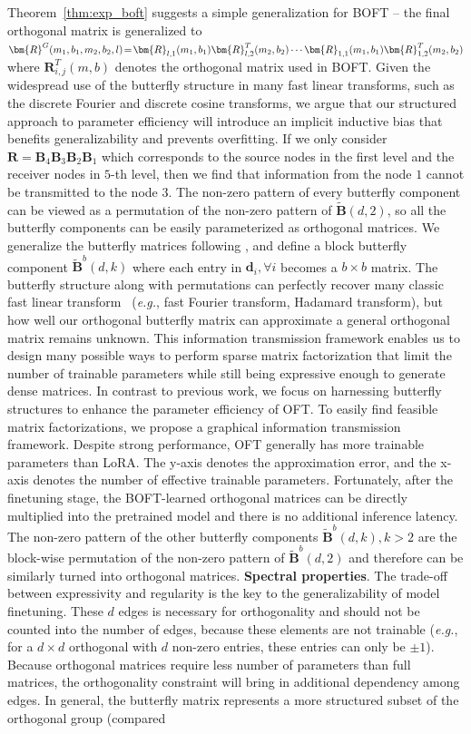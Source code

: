 Theorem~\ref{thm:exp_boft} suggests a simple generalization for BOFT -- the final orthogonal matrix is generalized to $\thickmuskip=2mu \medmuskip=2mu \bm{R}^G(m_1,b_1,m_2,b_2,l)=\bm{R}_{l,1}(m_1,b_1)\bm{R}_{l,2}^T(m_2,b_2)\cdots\bm{R}_{1,1}(m_1,b_1)\bm{R}_{1,2}^T(m_2,b_2)$ where $\bm{R}_{i,j}^T(m,b)$ denotes the orthogonal matrix used in BOFT. Given the widespread use of the butterfly structure in many fast linear transforms, such as the discrete Fourier and discrete cosine transforms, we argue that our structured approach to parameter efficiency will introduce an implicit inductive bias that benefits generalizability and prevents overfitting. If we only consider $\bm{R}=\bm{B}_4\bm{B}_3\bm{B}_2\bm{B}_1$ which corresponds to the source nodes in the first level and the receiver nodes in $5$-th level, then we find that information from the node $1$ cannot be transmitted to the node $3$. The non-zero pattern of every butterfly component can be viewed as a permutation of the non-zero pattern of $\tilde{\bm{B}}(d,2)$, so all the butterfly components can be easily parameterized as orthogonal matrices. We generalize the butterfly matrices following \cite{chen2022pixelated}, and define a block butterfly component $\tilde{\bm{B}}^b(d,k)$ where each entry in $\bm{d}_i,\forall i$ becomes a $b\times b$ matrix. The butterfly structure along with permutations can perfectly recover many classic fast linear transform~\cite{dao2019learning,dao2019kaleidoscope} (\emph{e.g.}, fast Fourier transform, Hadamard transform), but how well our orthogonal butterfly matrix can approximate a general orthogonal matrix remains unknown. This information transmission framework enables us to design many possible ways to perform sparse matrix factorization that limit the number of trainable parameters while still being expressive enough to generate dense matrices. In contrast to previous work, we focus on harnessing butterfly structures to enhance the parameter efficiency of OFT. To easily find feasible matrix factorizations, we propose a graphical information transmission framework. Despite strong performance, OFT generally has more trainable parameters than LoRA. The y-axis denotes the approximation error, and the x-axis denotes the number of effective trainable parameters. Fortunately, after the finetuning stage, the BOFT-learned orthogonal matrices can be directly multiplied into the pretrained model and there is no additional inference latency. The non-zero pattern of the other butterfly components $\tilde{\bm{B}}^b(d,k),k>2$ are the block-wise permutation of the non-zero pattern of $\tilde{\bm{B}}^b(d,2)$ and therefore can be similarly turned into orthogonal matrices. \textbf{Spectral properties}. The trade-off between expressivity and regularity is the key to the generalizability of model finetuning. These $d$ edges is necessary for orthogonality and should not be counted into the number of edges, because these elements are not trainable (\emph{e.g.}, for a $d\times d$ orthogonal with $d$ non-zero entries, these entries can only be $\pm 1$). Because orthogonal matrices require less number of parameters than full matrices, the orthogonality constraint will bring in additional dependency among edges. In general, the butterfly matrix represents a more structured subset of the orthogonal group (compared 